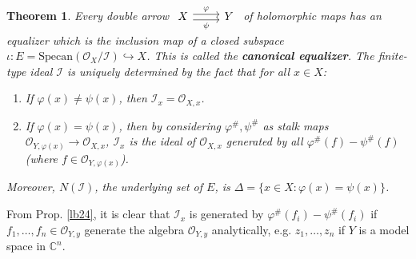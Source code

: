 \documentclass[12pt,b5paper,notitlepage]{report}
\theoremstyle{definition}
\theoremstyle{plain}
\newtheorem{thm}[df]{Theorem}
\newcommand{\mc}{\mathcal}
\newcommand{\scr}{\mathscr}
\newcommand{\Cbb}{\mathbb C}
\newcommand{\Specan}{\mathrm{Specan}}
\numberwithin{equation}{section}
\begin{document}
\begin{thm}\label{lb26}
Every double arrow $\begin{tikzcd}
X \arrow[r,shift left, "\varphi"] \arrow[r,shift right,"\psi"'] & Y
\end{tikzcd}$ of holomorphic maps has an equalizer which is the inclusion map of a closed subspace $\iota:E=\Specan(\scr O_X/\mc I)\hookrightarrow X$. This is called the \textbf{canonical equalizer}.  The finite-type ideal $\mc I$ is uniquely determined by the fact that for all $x\in X$:
\begin{enumerate}[label=(\alph*)]
\item If $\varphi(x)\neq\psi(x)$, then $\mc I_x=\scr O_{X,x}$.
\item If $\varphi(x)=\psi(x)$, then by considering $\varphi^\#,\psi^\#$ as stalk maps $\scr O_{Y,\varphi(x)}\rightarrow\scr O_{X,x}$, $\mc I_x$ is the ideal of $\scr O_{X,x}$ generated by all $\varphi^\#(f)-\psi^\#(f)$ (where $f\in\scr O_{Y,\varphi(x)}$).
\end{enumerate}
Moreover, $N(\mc I)$, the underlying set of $E$, is $\Delta=\{x\in X:\varphi(x)=\psi(x)\}$.
\end{thm}

From Prop. \ref{lb24}, it is clear that $\mc I_x$ is generated by $\varphi^\#(f_i)-\psi^\#(f_i)$ if $f_1,\dots,f_n\in\scr O_{Y,y}$ generate the algebra $\scr O_{Y,y}$ analytically, e.g. $z_1,\dots,z_n$ if $Y$ is a model space in $\Cbb^n$.
\end{document}
